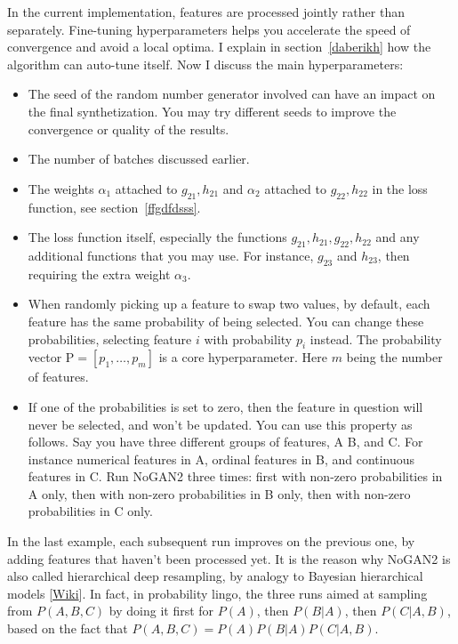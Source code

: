 \documentclass[oneside,10pt]{book}
\begin{document}
In the current implementation, features are processed jointly rather than separately. Fine-tuning \textcolor{index}{hyperparameters} helps you accelerate the speed of convergence and avoid a local optima. I explain in section~\ref{daberikh} how the algorithm can \textcolor{index}{auto-tune} itself. Now I discuss the main hyperparameters: \vspace{1ex}

\begin{itemize}
\item The \textcolor{index}{seed} of the random number generator involved can have an impact on the final synthetization. You may try different seeds to improve the convergence or quality of the results.
\item The number of \textcolor{index}{batches} discussed earlier.
\item The weights $\alpha_1$ attached to $g_{21}, h_{21}$ and  $\alpha_2$ attached to $g_{22}, h_{22}$ in the loss function, see section~\ref{ffgdfdsss}.
\item The \textcolor{index}{loss function} itself, especially the functions 
 $g_{21}, h_{21}, g_{22}, h_{22}$ and any additional functions that you may use. For instance, $g_{23}$ and $h_{23}$, then requiring the extra weight $\alpha_3$. 
\item When randomly picking up a feature to swap two values, by default, each feature has the same probability of being selected. You can change 
 these probabilities, selecting feature $i$ with probability $p_i$ instead. The probability vector $\text{P}=[p_1,\dots, p_m]$ is a core hyperparameter. 
 Here $m$ being the number of features.
\item If one of the probabilities is set to zero, then the feature in question will never be selected, and won't be updated. You can use
 this property as follows. Say you have three different groups of features, A B, and C.  For instance numerical features in A, ordinal features in B, and 
continuous features in C. Run NoGAN2 three times: first with non-zero probabilities in A only, then with non-zero probabilities in B only, then
 with non-zero probabilities in C only.
\end{itemize}\vspace{1ex}

\noindent In the last example, each subsequent run improves on the previous one, by adding features that haven't been processed yet. It is the reason
 why NoGAN2 is also called \textcolor{index}{hierarchical deep resampling}, by analogy to 
 \textcolor{index}{Bayesian hierarchical models} [\href{https://en.wikipedia.org/wiki/Bayesian_hierarchical_modeling}{Wiki}]. In fact, in probability lingo, the three runs aimed at sampling from $P(A, B, C)$ by doing it
 first for $P(A)$, then $P(B|A)$, then $P(C|A, B)$, based on the fact that 
$P(A, B, C) = P(A) P(B|A) P(C | A, B)$.
\end{document}
